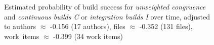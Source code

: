 \documentclass[12pt,oneside]{book}
\begin{document}
\begin{figure}
{     \label{subfig:prob_unweighted_age_typeci_q025}
  }
  
	\caption{Estimated probability of build success for \emph{unweighted congruence} and \emph{continuous builds C} or \emph{integration builds I}  over time, adjusted to authors $\approx$ -0.156 (17 authors), files $\approx$ -0.352 (131 files), work~items $\approx$ -0.399 (34 work items)}
	\label{fig:unweighted_congruence_typeci_age}
\end{figure}
\end{document}
